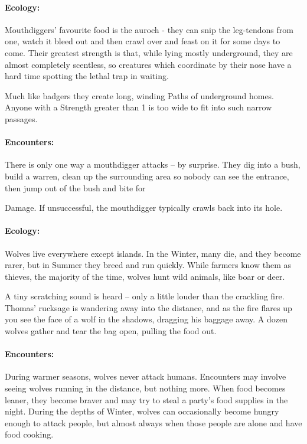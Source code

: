 \paragraph{Ecology:} Mouthdiggers' favourite food is the auroch - they can snip the leg-tendons from one, watch it bleed out and then crawl over and feast on it for some days to come.  Their greatest strength is that, while lying mostly underground, they are almost completely scentless, so creatures which coordinate by their nose have a hard time spotting the lethal trap in waiting.

Much like badgers they create long, winding Paths of underground homes.  Anyone with a Strength greater than 1 is too wide to fit into such narrow passages.

\paragraph{Encounters:} There is only one way a mouthdigger attacks -- by surprise.  They dig into a bush, build a warren, clean up the surrounding area so nobody can see the entrance, then jump out of the bush and bite for \addtocounter{strb}{-5} Damage.  If unsuccessful, the mouthdigger typically crawls back into its hole.

\label{wolf}
\wolf

\paragraph{Ecology:} Wolves live everywhere except islands.  In the Winter, many die, and they become rarer, but in Summer they breed and run quickly.  While farmers know them as thieves, the majority of the time, wolves hunt wild animals, like boar or deer.

\begin{boxtext}
	A tiny scratching sound is heard -- only a little louder than the crackling fire.  Thomas' rucksage is wandering away into the distance, and as the fire flares up you see the face of a wolf in the shadows, dragging his baggage away.  A dozen wolves gather and tear the bag open, pulling the food out.
\end{boxtext}

\paragraph{Encounters:} During warmer seasons, wolves never attack humans.  Encounters may involve seeing wolves running in the distance, but nothing more.  When food becomes leaner, they become braver and may try to steal a party's food supplies in the night.  During the depths of Winter, wolves can occasionally become hungry enough to attack people, but almost always when those people are alone and have food cooking.


